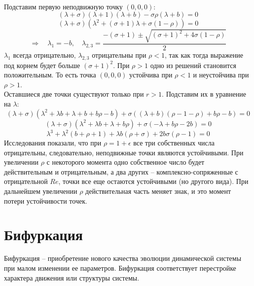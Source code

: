\documentclass[12pt]{article}
\begin{document}
\begin{enumerate}
\\ Подставим первую неподвижную точку $(0, 0, 0)$:
\begin{equation*}
(\lambda+\sigma)(\lambda+1)(\lambda+b)-\sigma\rho(\lambda+b)=0
\end{equation*}
\begin{equation*}
(\lambda+\sigma)(\lambda^2+(\sigma+1)\lambda+\sigma(1-\rho))=0
\end{equation*}
\begin{equation*}
\Rightarrow \quad \lambda_1=-b, \quad \lambda_{2,3}=\frac{-(\sigma+1)\pm\sqrt{(\sigma+1)^2+4\sigma(1-\rho)}}{2}
\end{equation*}
$\lambda_1$ всегда отрицательно, $\lambda_{2,3}$ отрицательны при $\rho<1$, так как тогда выражение под корнем будет больше $(\sigma+1)^2$. При $\rho>1$ одно из решений становится положительным. То есть точка $(0, 0, 0)$ устойчива при $\rho<1$ и неустойчива при $\rho>1$.
\\ Оставшиеся две точки существуют только при $r>1$. Подставим их в уравнение на $\lambda$:
\begin{equation*}
(\lambda+\sigma)(\lambda^2+\lambda b+\lambda+b+b\rho-b)+\sigma((\lambda+b)(\rho-1-\rho)+b\rho-b)=0
\end{equation*}
\begin{equation*}
(\lambda+\sigma)(\lambda^2+\lambda b+\lambda+b\rho)+\sigma(-\lambda+b\rho-2b)=0
\end{equation*}
\begin{equation*}
\lambda^3+\lambda^2(b+\rho+1)+\lambda b(\rho+\sigma)+2b\sigma(\rho-1)=0
\end{equation*}
Исследования показали, что при $\rho=1+\epsilon$ все три собственных числа отрицательны, следовательно, неподвижные точки являются устойчивыми. При увеличении $\rho$ с некоторого момента одно собственное число будет действительным и отрицательным, а два других -- комплексно-сопряженные с отрицательной $Re$, точки все еще остаются устойчивыми (но другого вида). При дальнейшем увеличении $\rho$ действительная часть меняет знак, и это момент потери устойчивости точек.
\end{enumerate}

\section{Бифуркация}

Бифуркация -- приобретение нового качества эволюции
динамической системы при малом изменении ее параметров.
Бифуркация соответствует перестройке характера движения
или структуры системы.
\end{document}

